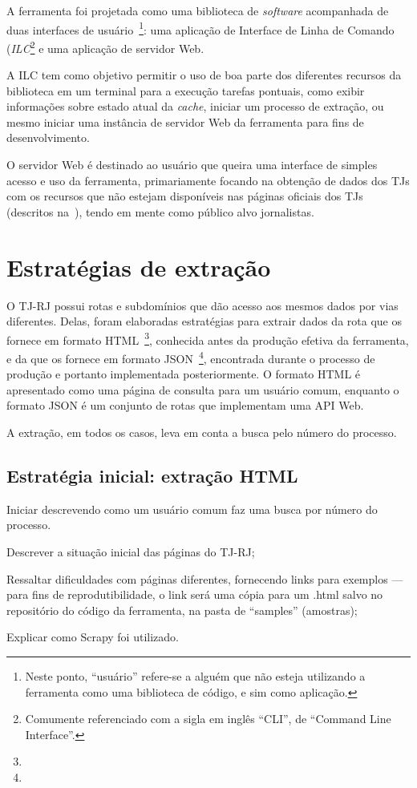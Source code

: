 A ferramenta foi projetada como uma biblioteca de \textit{software} acompanhada
de duas interfaces de usuário~\footnote{Neste ponto, ``usuário'' refere-se a
alguém que não esteja utilizando a ferramenta como uma biblioteca de código, e
sim como aplicação.}: uma aplicação de Interface de Linha de Comando
(\textit{ILC}\footnote{Comumente referenciado com a sigla em inglês ``CLI'', de
``Command Line Interface''.} e uma aplicação de servidor Web.

A ILC tem como objetivo permitir o uso de boa parte dos diferentes recursos da
biblioteca em um terminal para a execução tarefas pontuais, como exibir
informações sobre estado atual da \textit{cache}, iniciar um processo de
extração, ou mesmo iniciar uma instância de servidor Web da ferramenta para
fins de desenvolvimento.

O servidor Web é destinado ao usuário que queira uma interface de simples
acesso e uso da ferramenta, primariamente focando na obtenção de dados dos TJs
com os recursos que não estejam disponíveis nas páginas oficiais dos TJs
(descritos na~), tendo em mente como público alvo
jornalistas.

\section{Estratégias de extração}

O TJ-RJ possui rotas e subdomínios que dão acesso aos mesmos dados por vias
diferentes. Delas, foram elaboradas estratégias para extrair dados da rota que
os fornece em formato HTML~\footnote{}, conhecida antes
da produção efetiva da ferramenta, e da que os fornece em formato
JSON~\footnote{}, encontrada durante o processo de
produção e portanto implementada posteriormente. O formato HTML é apresentado
como uma página de consulta para um usuário comum, enquanto o formato JSON é
um conjunto de rotas que implementam uma API Web.

A extração, em todos os casos, leva em conta a busca pelo número do processo.

\subsection{Estratégia inicial: extração HTML}

\begin{todolist}
    \item Iniciar descrevendo como um usuário comum faz uma busca por número do processo.
    \item Descrever a situação inicial das páginas do TJ-RJ;
    \item Ressaltar dificuldades com páginas diferentes, fornecendo links para
          exemplos --- para fins de reprodutibilidade, o link será uma cópia
          para um .html salvo no repositório do código da ferramenta, na pasta
          de ``samples'' (amostras);
    \item Explicar como Scrapy foi utilizado.
\end{todolist}

